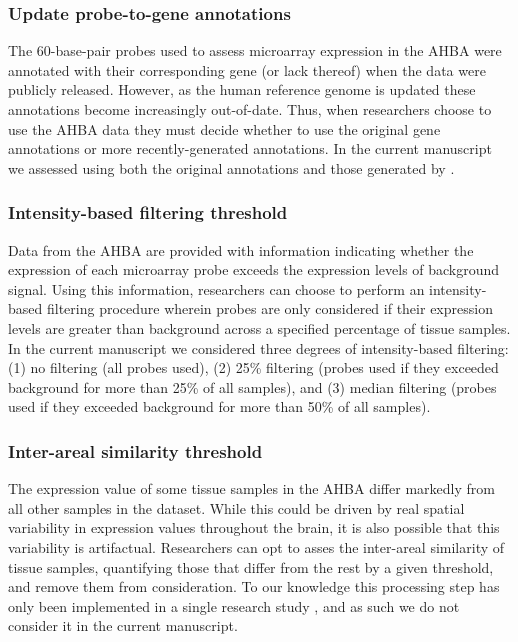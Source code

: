 \documentclass[12pt,aps,pra,reprint,showkeys]{revtex4-1}
\begin{document}
\subsubsection*{Update probe-to-gene annotations}

The 60-base-pair probes used to assess microarray expression in the AHBA were annotated with their corresponding gene (or lack thereof) when the data were publicly released.
However, as the human reference genome is updated these annotations become increasingly out-of-date.
Thus, when researchers choose to use the AHBA data they must decide whether to use the original gene annotations or more recently-generated annotations.
In the current manuscript we assessed using both the original annotations and those generated by \citet{arnatkeviciute2019neuroimage}.

\subsubsection*{Intensity-based filtering threshold}

Data from the AHBA are provided with information indicating whether the expression of each microarray probe exceeds the expression levels of background signal.
Using this information, researchers can choose to perform an intensity-based filtering procedure wherein probes are only considered if their expression levels are greater than background across a specified percentage of tissue samples.
In the current manuscript we considered three degrees of intensity-based filtering: (1) no filtering (all probes used), (2) 25\% filtering (probes used if they exceeded background for more than 25\% of all samples), and (3) median filtering (probes used if they exceeded background for more than 50\% of all samples).

\subsubsection*{Inter-areal similarity threshold}

The expression value of some tissue samples in the AHBA differ markedly from all other samples in the dataset.
While this could be driven by real spatial variability in expression values throughout the brain, it is also possible that this variability is artifactual.
Researchers can opt to asses the inter-areal similarity of tissue samples, quantifying those that differ from the rest by a given threshold, and remove them from consideration.
To our knowledge this processing step has only been implemented in a single research study \citep{burt2018natneuro}, and as such we do not consider it in the current manuscript.
\end{document}
